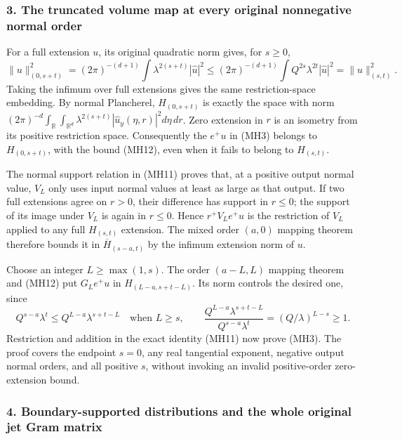 \documentclass[
  11pt,
]{article}
\begin{document}
\subsubsection{3. The truncated volume map at every original nonnegative
normal
order}\label{the-truncated-volume-map-at-every-original-nonnegative-normal-order}

For a full extension \(u\), its original quadratic norm gives, for
\(s\geq0\), \[
 \|u\|_{(0,s+t)}^2
 =(2\pi)^{-(d+1)}\int
       \lambda^{2(s+t)}|\widehat u|^2
 \leq(2\pi)^{-(d+1)}\int
       Q^{2s}\lambda^{2t}|\widehat u|^2
 =\|u\|_{(s,t)}^2.
 \tag{MH12}
\] Taking the infimum over full extensions gives the same
restriction-space embedding. By normal Plancherel, \(H_{(0,s+t)}\) is
exactly the space with norm
\((2\pi)^{-d}\int_{\mathbb R}\int_{\mathbb R^d}\lambda^{2(s+t)}|\widehat u_y(\eta,r)|^2d\eta\,dr\).
Zero extension in \(r\) is an isometry from its positive restriction
space. Consequently the \(e^+u\) in (MH3) belongs to \(H_{(0,s+t)}\),
with the bound (MH12), even when it fails to belong to \(H_{(s,t)}\).

The normal support relation in (MH11) proves that, at a positive output
normal value, \(V_L\) only uses input normal values at least as large as
that output. If two full extensions agree on \(r>0\), their difference
has support in \(r\leq0\); the support of its image under \(V_L\) is
again in \(r\leq0\). Hence \(r^+V_Le^+u\) is the restriction of \(V_L\)
applied to any full \(H_{(s,t)}\) extension. The mixed order \((a,0)\)
mapping theorem therefore bounds it in \(\overline H_{(s-a,t)}\) by the
infimum extension norm of \(u\).

Choose an integer \(L\geq\max(1,s)\). The order \((a-L,L)\) mapping
theorem and (MH12) put \(G_Le^+u\) in \(H_{(L-a,s+t-L)}\). Its norm
controls the desired one, since \[
 Q^{s-a}\lambda^t
 \leq Q^{L-a}\lambda^{s+t-L}
 \quad\text{when }L\geq s,
 \qquad
 \frac{Q^{L-a}\lambda^{s+t-L}}{Q^{s-a}\lambda^t}
   =(Q/\lambda)^{L-s}\geq1.
 \tag{MH13}
\] Restriction and addition in the exact identity (MH11) now prove
(MH3). The proof covers the endpoint \(s=0\), any real tangential
exponent, negative output normal orders, and all positive \(s\), without
invoking an invalid positive-order zero-extension bound.

\subsubsection{4. Boundary-supported distributions and the whole
original jet Gram
matrix}\label{boundary-supported-distributions-and-the-whole-original-jet-gram-matrix}
\end{document}
